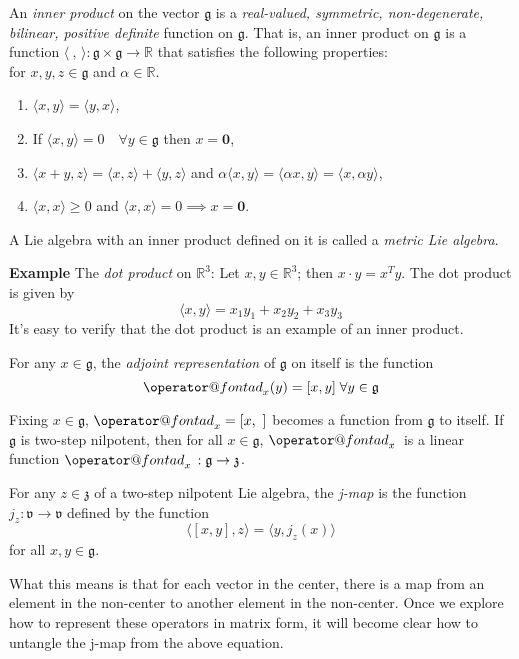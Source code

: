 \documentclass[11 pt]{article}
\makeatletter
\renewcommand{\a}{\alpha}
\newcommand{\br}[2]{\left[#1,#2\right]}
\newcommand{\inp}[2]{\langle #1, #2 \rangle}
\newcommand{\inpe}{\inp{\ }{\,}}
\newcommand{\lag}[1]{\mathfrak{#1}}
\newcommand{\R}{\mathbb{R}}
\newcommand{\fg}{\mathfrak{g}}
\newcommand{\fz}{\mathfrak{z}}
\newcommand{\fv}{\mathfrak{v}}
\newcommand{\zvec}{\mathbf{0}}
\newcommand{\RR}{\mathbb{R}}
\newcommand{\ad}[1]{\mathop{\operator@font ad}\nolimits_{#1}}
\makeatother
\begin{document}
\begin{definition}
    An \emph{inner product} on the vector $\fg$ is a
    \emph{real-valued, symmetric, non-degenerate, bilinear, positive definite}
    function on $\fg$.  That is, an inner product on $\fg$ is a function
    $\inpe:\fg\times\fg\to\RR$ that satisfies the
    following properties:
    \\for $x,y,z \in \fg$ and $\a \in \RR$.
    \begin{enumerate}
        \item $\langle x,y \rangle = \langle y,x \rangle$,
        \item If $\langle x,y \rangle = 0 \quad \forall y \in \fg$
            then $x = \zvec$,
        \item
            $\langle x+y,z \rangle = \langle x,z \rangle + \langle y,z \rangle$
            and $\a \langle x,y \rangle = \langle \a x,y \rangle
            = \langle x,\a y \rangle$,
        \item $\langle x,x \rangle \geq 0$
            and $\langle x,x\rangle = 0 \implies x=\zvec$.
    \end{enumerate}
    A Lie algebra with an inner product defined on it is called a
    \emph{metric Lie algebra}.
\end{definition}
{\bf Example} The \emph{dot product} on $\R^3$:
Let $x, y \in \R^3$; then $x \cdot y = x^Ty$.  The dot product is given by
\[
    \langle x,y \rangle =  x_1y_1 + x_2y_2 + x_3y_3
\]
It's easy to verify that the dot product is an example of an inner product.

\begin{definition}
    For any $x \in \fg$, the \emph{adjoint representation} of $\fg$ on itself is
    the function
    \[
        \ad{x}(y) = [x,y] \; \forall y \in \fg
    \]
\end{definition}

Fixing $x \in \lag{g}$, $\ad{x} = \br{x}{\ }$ becomes a function from
$\lag{g}$ to itself.  If $\fg$ is two-step nilpotent, then for all
$x \in \fg$, $\ad{x}{}$ is a linear function $\ad{x}{}: \fg \to \fz$.

\begin{definition}
    For any $z \in \fz$ of a two-step nilpotent Lie algebra, the \emph{j-map} is
    the function $j_z :\fv \to \fv$ defined by the function
    \[
    \langle\br{x}{y},z\rangle = \langle y,j_z(x)\rangle
    \]
    for all $x, y \in \lag{g}$.
\end{definition}

What this means is that for each vector in the center, there is a map from an
element in the non-center to another element in the non-center.  Once we
explore how to represent these operators in matrix form, it will become clear
how to untangle the j-map from the above equation.
\end{document}
